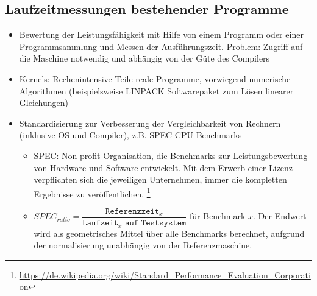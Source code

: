 \subsection{Laufzeitmessungen bestehender Programme}
\begin{itemize}
	\item Bewertung der Leistungsfähigkeit mit Hilfe von einem Programm oder einer Programmsammlung und Messen der Ausführungszeit. Problem: Zugriff auf die Maschine notwendig und abhängig von der Güte des Compilers
	\item Kernels: Rechenintensive Teile reale Programme, vorwiegend numerische Algorithmen (beispielsweise LINPACK Softwarepaket zum Lösen linearer Gleichungen)
	\item Standardisierung zur Verbesserung der Vergleichbarkeit von Rechnern (inklusive OS und Compiler), z.B. SPEC CPU Benchmarks
	\begin{itemize}
		\item SPEC: Non-profit Organisation, die Benchmarks zur Leistungsbewertung von Hardware und Software entwickelt. Mit dem Erwerb einer Lizenz verpflichten sich die jeweiligen Unternehmen, immer die kompletten Ergebnisse zu veröffentlichen. \footnote{\url{https://de.wikipedia.org/wiki/Standard_Performance_Evaluation_Corporation}}
		\item $SPEC_{ratio} = \dfrac{\texttt{Referenzzeit}_x}{\texttt{Laufzeit}_x\texttt{ auf Testsystem}}$ für Benchmark $x$. Der Endwert wird als geometrisches Mittel über alle Benchmarks berechnet, aufgrund der normalisierung unabhängig von der Referenzmaschine.
	\end{itemize}
\end{itemize}

